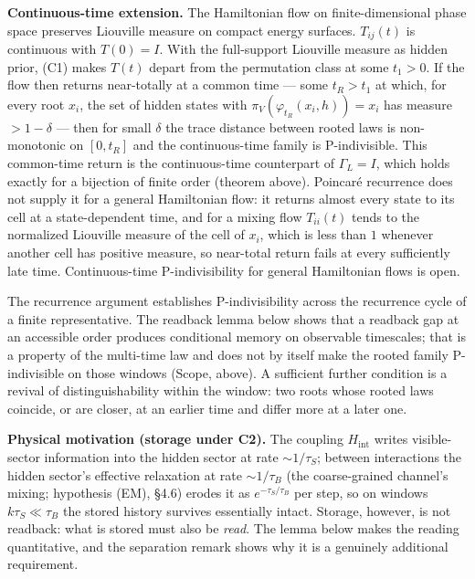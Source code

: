 \documentclass[
]{article}
\begin{document}
\textbf{Continuous-time extension.} The Hamiltonian flow on
finite-dimensional phase space preserves Liouville measure on compact
energy surfaces. \(T_{ij}(t)\) is continuous with \(T(0) = I\). With the
full-support Liouville measure as hidden prior, (C1) makes \(T(t)\)
depart from the permutation class at some \(t_1 > 0\). If the flow then
returns near-totally at a common time --- some \(t_R > t_1\) at which,
for every root \(x_i\), the set of hidden states with
\(\pi_V(\varphi_{t_R}(x_i, h)) = x_i\) has measure \(> 1 - \delta\) ---
then for small \(\delta\) the trace distance between rooted laws is
non-monotonic on \([0, t_R]\) and the continuous-time family is
P-indivisible. This common-time return is the continuous-time
counterpart of \(\Gamma_L = I\), which holds exactly for a bijection of
finite order (theorem above). Poincaré recurrence does not supply it for
a general Hamiltonian flow: it returns almost every state to its cell at
a state-dependent time, and for a mixing flow \(T_{ii}(t)\) tends to the
normalized Liouville measure of the cell of \(x_i\), which is less than
\(1\) whenever another cell has positive measure, so near-total return
fails at every sufficiently late time. Continuous-time P-indivisibility
for general Hamiltonian flows is open.

The recurrence argument establishes P-indivisibility across the
recurrence cycle of a finite representative. The readback lemma below
shows that a readback gap at an accessible order produces conditional
memory on observable timescales; that is a property of the multi-time
law and does not by itself make the rooted family P-indivisible on those
windows (Scope, above). A sufficient further condition is a revival of
distinguishability within the window: two roots whose rooted laws
coincide, or are closer, at an earlier time and differ more at a later
one.

\textbf{Physical motivation (storage under C2).} The coupling
\(H_{\text{int}}\) writes visible-sector information into the hidden
sector at rate \(\sim 1/\tau_S\); between interactions the hidden
sector's effective relaxation at rate \(\sim 1/\tau_B\) (the
coarse-grained channel's mixing; hypothesis (EM), §4.6) erodes it as
\(e^{-\tau_S/\tau_B}\) per step, so on windows \(k\tau_S \ll \tau_B\)
the stored history survives essentially intact. Storage, however, is not
readback: what is stored must also be \emph{read}. The lemma below makes
the reading quantitative, and the separation remark shows why it is a
genuinely additional requirement.
\end{document}
